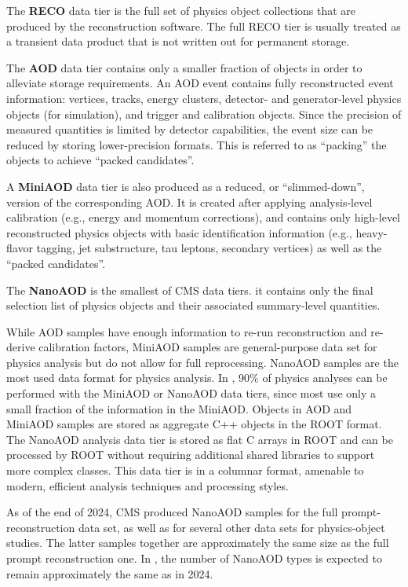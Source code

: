 The \textbf{RECO} data tier is the full set of physics object collections that are produced by the reconstruction software. The full \gls{RECO} tier is usually treated as a transient data product that is not written out for permanent storage. 

The \textbf{AOD} data tier contains only a smaller fraction of objects in order to alleviate storage requirements. An AOD event contains fully reconstructed event information: vertices, tracks, energy clusters, detector- and generator-level physics objects (for simulation), and trigger and calibration objects. Since the precision of measured quantities is limited by detector capabilities, the event size can be reduced by storing lower-precision formats. This is referred to as ``packing'' the objects to achieve ``packed candidates''. 

A \textbf{MiniAOD} data tier is also produced as a reduced, or ``slimmed-down'', version of the corresponding AOD. It is created after applying analysis-level calibration (e.g., energy and momentum corrections), and contains only high-level reconstructed physics objects with basic identification information (e.g., heavy-flavor tagging, jet substructure, tau leptons, secondary vertices) as well as the ``packed candidates''. 

The \textbf{NanoAOD} is the smallest of CMS data tiers. it contains only the final selection list of physics objects and their associated summary-level quantities. 

While AOD samples have enough information to re-run reconstruction and re-derive calibration factors, MiniAOD samples are general-purpose data set for physics analysis but do not allow for full reprocessing. NanoAOD samples are the most used data format for physics analysis.
In \RunThree, 90\% of physics analyses can be performed with the MiniAOD or NanoAOD data tiers, since most use only a small fraction of the information in the MiniAOD. 
Objects in AOD and MiniAOD samples are stored as aggregate C++ objects in the \textsc{ROOT} format.
The NanoAOD analysis data tier is stored as flat C arrays in \textsc{ROOT} and can be processed by \textsc{ROOT} without requiring additional shared libraries to support more complex classes. This data tier is in a columnar format, amenable to modern, efficient analysis techniques and processing styles.

As of the end of 2024, CMS produced NanoAOD samples for the full prompt-reconstruction data set, as well as for several other data sets for physics-object studies. The latter samples together are approximately the same size as the full prompt reconstruction one. In \PhaseTwo, the number of NanoAOD types is expected to remain approximately the same as in 2024.

